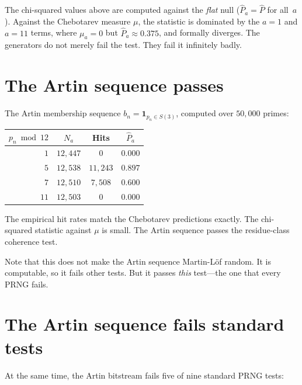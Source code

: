 \documentclass[11pt]{article}
\theoremstyle{definition}
\theoremstyle{remark}
\begin{document}
The chi-squared values above are computed against the
\emph{flat} null ($\hat{P}_a = \hat{P}$ for all~$a$).
Against the Chebotarev measure $\mu$,
the statistic is dominated by the $a = 1$ and $a = 11$
terms, where $\mu_a = 0$ but $\hat{P}_a \approx 0.375$,
and formally diverges.
The generators do not merely fail the test.
They fail it infinitely badly.

\section{The Artin sequence passes}

The Artin membership sequence
$b_n = \mathbf{1}_{p_n \in S(3)}$, computed over $50{,}000$ primes:

\begin{center}
\begin{tabular}{rccc}
\toprule
$p_n \bmod 12$ & $N_a$ & Hits & $\hat{P}_a$ \\
\midrule
$1$  & $12{,}447$ & $0$      & $0.000$ \\
$5$  & $12{,}538$ & $11{,}243$ & $0.897$ \\
$7$  & $12{,}510$ & $7{,}508$  & $0.600$ \\
$11$ & $12{,}503$ & $0$      & $0.000$ \\
\bottomrule
\end{tabular}
\end{center}

The empirical hit rates match the Chebotarev predictions exactly.
The chi-squared statistic against $\mu$ is small.
The Artin sequence passes the residue-class coherence test.

Note that this does not make the Artin sequence Martin-L\"of random.
It is computable, so it fails other tests.
But it passes \emph{this} test---the one that every PRNG fails.

\section{The Artin sequence fails standard tests}

At the same time, the Artin bitstream fails
five of nine standard PRNG tests:
\end{document}
